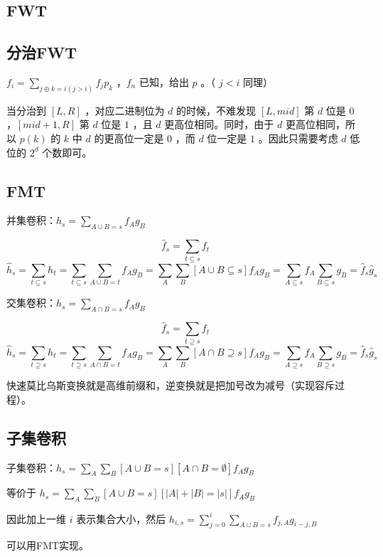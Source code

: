 

\newpage


\subsection{FWT}



\subsection{分治FWT}

$f_i=\sum_{j\oplus k=i(j>i)}f_jp_k$ ，$f_n$ 已知，给出 $p$ 。（ $j<i$ 同理）

当分治到 $[L,R]$ ，对应二进制位为 $d$ 的时候，不难发现 $[L,mid]$ 第 $d$ 位是 $0$ ，$[mid+1,R]$ 第 $d$ 位是 $1$ ，且 $d$ 更高位相同。同时，由于 $d$ 更高位相同，所以 $p(k)$ 的 $k$ 中 $d$ 的更高位一定是 $0$ ，而 $d$ 位一定是 $1$ 。因此只需要考虑 $d$ 低位的 $2^d$ 个数即可。




\newpage

\subsection{FMT}

并集卷积：$h_s=\sum_{A\cup B=s}f_Ag_B$

$$
\hat{f}_s=\sum_{t\subseteq s}f_t
$$
$$
\hat{h}_s=\sum_{t\subseteq s}h_t=\sum_{t\subseteq s}\sum_{A\cup B=t}f_Ag_B=\sum_{A}\sum_{B}[A\cup B\subseteq s]f_Ag_B=\sum_{A\subseteq s}f_A\sum_{B\subseteq s}g_B=\hat{f}_s\hat{g}_s
$$

交集卷积：$h_s=\sum_{A\cap B=s}f_Ag_B$

$$
\hat{f}_s=\sum_{t\supseteq s}f_t
$$
$$
\hat{h}_s=\sum_{t\supseteq s}h_t=\sum_{t\supseteq s}\sum_{A\cap B=t}f_Ag_B=\sum_{A}\sum_{B}[A\cap B\supseteq s]f_Ag_B=\sum_{A\supseteq s}f_A\sum_{B\supseteq s}g_B=\hat{f}_s\hat{g}_s
$$

快速莫比乌斯变换就是高维前缀和，逆变换就是把加号改为减号（实现容斥过程）。




\subsection{子集卷积}

子集卷积：$h_s=\sum_A\sum_B[A\cup B=s][A\cap B=\emptyset]f_Ag_B$

等价于 $h_s=\sum_A\sum_B[A\cup B=s][|A|+|B|=|s|]f_Ag_B$

因此加上一维 $i$ 表示集合大小，然后 $h_{i,s}=\sum_{j=0}^{i}\sum_{A\cup B=s}f_{j,A}g_{i-j,B}$

可以用FMT实现。

